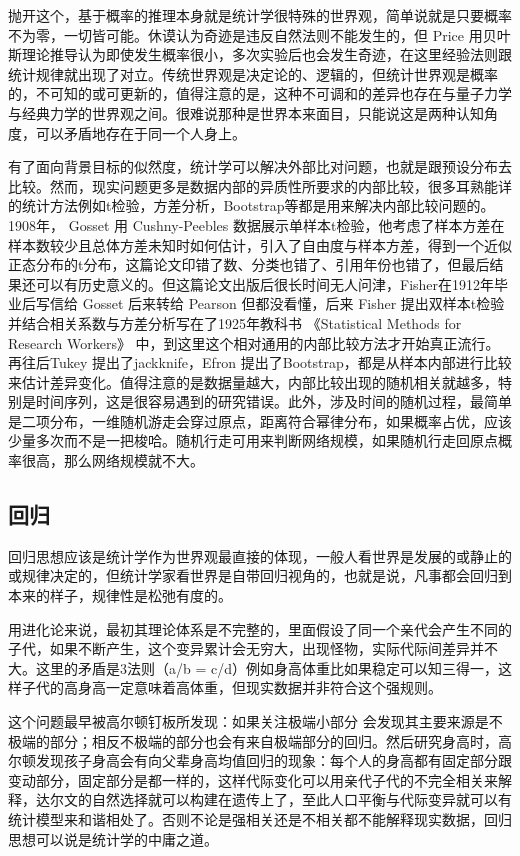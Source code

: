 \documentclass[]{tufte-book}
\begin{document}
抛开这个，基于概率的推理本身就是统计学很特殊的世界观，简单说就是只要概率不为零，一切皆可能。休谟认为奇迹是违反自然法则不能发生的，但 Price 用贝叶斯理论推导认为即使发生概率很小，多次实验后也会发生奇迹，在这里经验法则跟统计规律就出现了对立。传统世界观是决定论的、逻辑的，但统计世界观是概率的，不可知的或可更新的，值得注意的是，这种不可调和的差异也存在与量子力学与经典力学的世界观之间。很难说那种是世界本来面目，只能说这是两种认知角度，可以矛盾地存在于同一个人身上。

有了面向背景目标的似然度，统计学可以解决外部比对问题，也就是跟预设分布去比较。然而，现实问题更多是数据内部的异质性所要求的内部比较，很多耳熟能详的统计方法例如t检验，方差分析，Bootstrap等都是用来解决内部比较问题的。1908年， Gosset 用 Cushny-Peebles 数据展示单样本t检验，他考虑了样本方差在样本数较少且总体方差未知时如何估计，引入了自由度与样本方差，得到一个近似正态分布的t分布，这篇论文印错了数、分类也错了、引用年份也错了，但最后结果还可以有历史意义的。但这篇论文出版后很长时间无人问津，Fisher在1912年毕业后写信给 Gosset 后来转给 Pearson 但都没看懂，后来 Fisher 提出双样本t检验并结合相关系数与方差分析写在了1925年教科书 《Statistical Methods for Research Workers》 中，到这里这个相对通用的内部比较方法才开始真正流行。再往后Tukey 提出了jackknife，Efron 提出了Bootstrap，都是从样本内部进行比较来估计差异变化。值得注意的是数据量越大，内部比较出现的随机相关就越多，特别是时间序列，这是很容易遇到的研究错误。此外，涉及时间的随机过程，最简单是二项分布，一维随机游走会穿过原点，距离符合幂律分布，如果概率占优，应该少量多次而不是一把梭哈。随机行走可用来判断网络规模，如果随机行走回原点概率很高，那么网络规模就不大。

\hypertarget{ux56deux5f52}{%
\subsection{回归}\label{ux56deux5f52}}

回归思想应该是统计学作为世界观最直接的体现，一般人看世界是发展的或静止的或规律决定的，但统计学家看世界是自带回归视角的，也就是说，凡事都会回归到本来的样子，规律性是松弛有度的。

用进化论来说，最初其理论体系是不完整的，里面假设了同一个亲代会产生不同的子代，如果不断产生，这个变异累计会无穷大，出现怪物，实际代际间差异并不大。这里的矛盾是3法则（a/b = c/d）例如身高体重比如果稳定可以知三得一，这样子代的高身高一定意味着高体重，但现实数据并非符合这个强规则。

这个问题最早被高尔顿钉板所发现：如果关注极端小部分 会发现其主要来源是不极端的部分；相反不极端的部分也会有来自极端部分的回归。然后研究身高时，高尔顿发现孩子身高会有向父辈身高均值回归的现象：每个人的身高都有固定部分跟变动部分，固定部分是都一样的，这样代际变化可以用亲代子代的不完全相关来解释，达尔文的自然选择就可以构建在遗传上了，至此人口平衡与代际变异就可以有统计模型来和谐相处了。否则不论是强相关还是不相关都不能解释现实数据，回归思想可以说是统计学的中庸之道。
\end{document}
